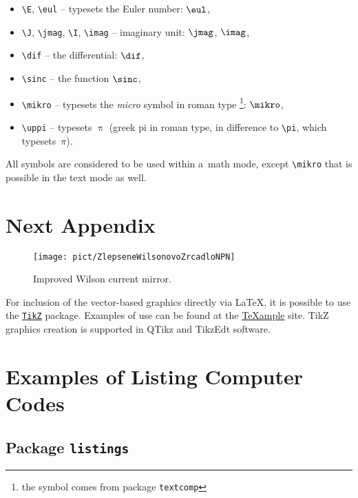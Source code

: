 \begin{itemize}
  \item
    \verb|\E|, \verb|\eul| -- typesets the Euler number: $\eul$,
  \item
    \verb|\J|, \verb|\jmag|, \verb|\I|, \verb|\imag| -- imaginary unit: $\jmag$, $\imag$,
  \item
    \verb|\dif| -- the differential: $\dif$,
  \item
    \verb|\sinc| -- the function $\sinc$,
  \item
    \verb|\mikro| -- typesets the \emph{micro} symbol in roman type%
			\footnote{the symbol comes from package \texttt{textcomp}}: $\mikro$,
	\item
		\verb|\uppi| -- typesets $\uppi$
			(greek pi in roman type, in difference to \verb|\pi|, which typesets~$\pi$).
\end{itemize}
%
All symbols are considered to be used within a~math mode, except \verb|\mikro| that is possible in the text mode as well.


\chapter{Next Appendix}

\begin{figure}[!h]
  \begin{center}
    \texttt{[image: pict/ZlepseneWilsonovoZrcadloNPN]}
  \end{center}
  \caption[Wilson mirror]{Improved Wilson current mirror.}
\end{figure}

For inclusion of the vector-based graphics directly via \LaTeX, it is possible to use the \href{https://www.ctan.org/pkg/pgf}{\texttt{TikZ}} package.
Examples of use can be found at the \href{http://www.texample.net/tikz/examples/}{\TeX{}ample} site.
TikZ graphics creation is supported in QTikz and TikzEdt software.




\chapter{Examples of Listing Computer Codes}

\section{Package \texttt{listings}}

